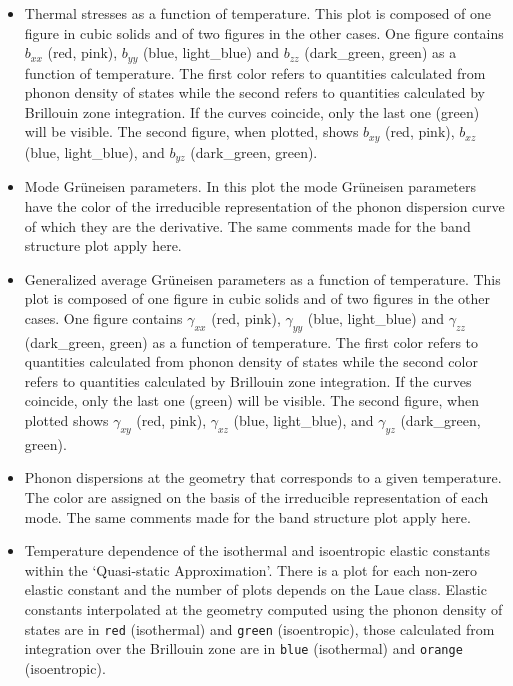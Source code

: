 \documentclass[12pt,a4paper]{article}
\begin{document}
\begin{itemize}
\item
Thermal stresses as a function of temperature. This plot is composed of
one figure in cubic solids and of two figures in the other cases. 
One figure contains $b_{xx}$ (red, pink), $b_{yy}$ (blue, light\_blue)
and $b_{zz}$ (dark\_green, green) as a function of temperature. 
The first color refers to quantities calculated from phonon density of states
while the second refers to quantities calculated by Brillouin zone
integration. If the curves coincide, only the last one (green) will 
be visible. The second figure, when plotted, shows $b_{xy}$ (red, pink), 
$b_{xz}$ (blue, light\_blue), and $b_{yz}$ (dark\_green, green).

\item
Mode Gr\"uneisen parameters. In this plot the mode Gr\"uneisen parameters have
the color of the irreducible representation of the phonon dispersion curve
of which they are the derivative.
The same comments made for the band structure plot apply here.

\item
Generalized average Gr\"uneisen parameters as a function of temperature. 
This plot is composed of one figure in cubic solids and of two figures in 
the other cases. 
One figure contains $\gamma_{xx}$ (red, pink), $\gamma_{yy}$ (blue, light\_blue)
and $\gamma_{zz}$ (dark\_green, green) as a function of temperature. 
The first color refers to quantities calculated from phonon density of states
while the second color refers to quantities calculated by Brillouin zone
integration.
If the curves coincide, only the last one (green) will be visible. 
The second figure, 
when plotted shows $\gamma_{xy}$ (red, pink), $\gamma_{xz}$ 
(blue, light\_blue), and $\gamma_{yz}$ (dark\_green, green).

\item
Phonon dispersions at the geometry that corresponds to a given temperature. 
The color are assigned on the basis of the irreducible representation of
each mode. The same comments made for the band structure plot apply here.

\item
Temperature dependence of the isothermal and isoentropic elastic constants 
within the 
`Quasi-static Approximation'. There is a plot for each non-zero
elastic constant and the number of plots depends on the Laue class. 
Elastic constants 
interpolated at the geometry computed using the phonon density of states 
are in \texttt{red} (isothermal) and \texttt{green} (isoentropic), 
those calculated from integration over the 
Brillouin zone are in \texttt{blue} (isothermal) and \texttt{orange} 
(isoentropic).

\end{itemize}
\end{document}
